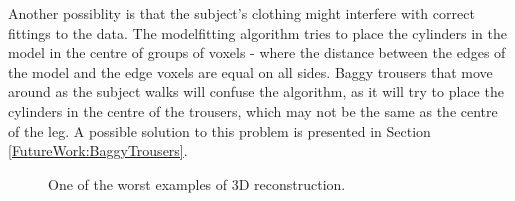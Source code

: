 Another possiblity is that the subject's clothing might interfere with correct fittings to the data.
The modelfitting algorithm tries to place the cylinders in the model in the centre of groups of voxels - where the distance between the edges of the model and the edge voxels are equal on all sides.
Baggy trousers that move around as the subject walks will confuse the algorithm, as it will try to place the cylinders in the centre of the trousers, which may not be the same as the centre of the leg.
A possible solution to this problem is presented in Section \ref{FutureWork:BaggyTrousers}.

\begin{figure}[bp]
	\centering
	\quad
	
	\caption{One of the worst examples of 3D reconstruction.}
	\label{BadData}
\end{figure}

